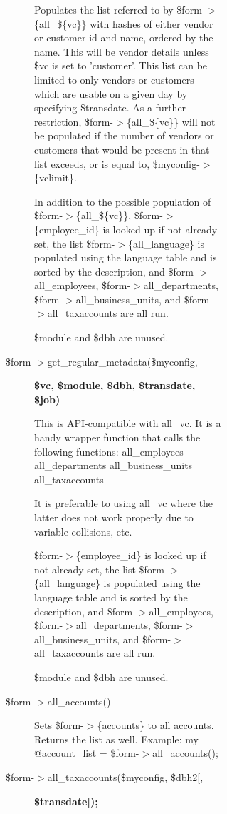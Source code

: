 \begin{description}
\begin{description}
\begin{description}
\begin{description}
\begin{description}
\begin{description}
Populates the list referred to by \$form-$>$\{all\_\$\{vc\}\} with hashes of either
vendor or customer id and name, ordered by the name.  This will be vendor
details unless \$vc is set to 'customer'.  This list can be limited to only
vendors or customers which are usable on a given day by specifying \$transdate.
As a further restriction, \$form-$>$\{all\_\$\{vc\}\} will not be populated if the
number of vendors or customers that would be present in that list exceeds, or
is equal to, \$myconfig-$>$\{vclimit\}.



In addition to the possible population of \$form-$>$\{all\_\$\{vc\}\},
\$form-$>$\{employee\_id\} is looked up if not already set, the list
\$form-$>$\{all\_language\} is populated using the language table and is sorted by the
description, and \$form-$>$all\_employees, \$form-$>$all\_departments,
\$form-$>$all\_business\_units, and \$form-$>$all\_taxaccounts are all run.



\$module and \$dbh are unused.


\item[{\$form-$>$get\_regular\_metadata(\$myconfig,}] \textbf{\$vc, \$module, \$dbh, \$transdate, \$job)}

This is API-compatible with all\_vc.  It is a handy wrapper function that calls
the following functions:
all\_employees
all\_departments
all\_business\_units
all\_taxaccounts



It is preferable to using all\_vc where the latter does not work properly due to
variable collisions, etc.



\$form-$>$\{employee\_id\} is looked up if not already set, the list
\$form-$>$\{all\_language\} is populated using the language table and is sorted by the
description, and \$form-$>$all\_employees, \$form-$>$all\_departments,
\$form-$>$all\_business\_units, and \$form-$>$all\_taxaccounts are all run.



\$module and \$dbh are unused.


\item[{\$form-$>$all\_accounts()}] \mbox{}

Sets \$form-$>$\{accounts\} to all accounts.  Returns the list as well.
Example:  my @account\_list = \$form-$>$all\_accounts();


\item[{\$form-$>$all\_taxaccounts(\$myconfig, \$dbh2[,}] \textbf{\$transdate]);}


\end{description}
\end{description}
\end{description}
\end{description}
\end{description}
\end{description}
